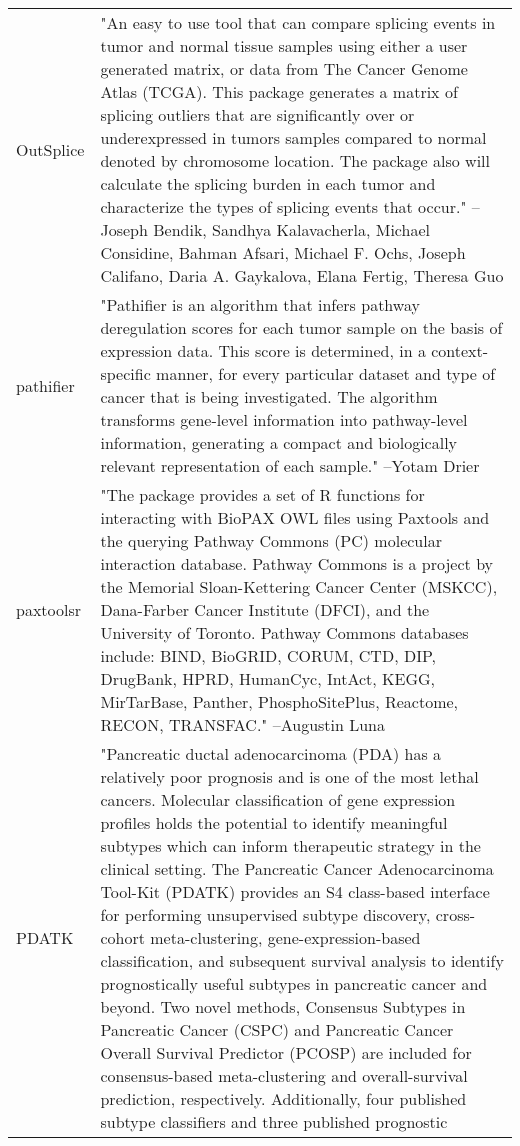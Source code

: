 \begin{longtable}[t]{l>{\raggedright\arraybackslash}p{25em}}
OutSplice & "An easy to use tool that can compare splicing events in
tumor and normal tissue samples using either a user generated
matrix, or data from The Cancer Genome Atlas (TCGA). This
package generates a matrix of splicing outliers that are
significantly over or underexpressed in tumors samples compared
to normal denoted by chromosome location. The package also will
calculate the splicing burden in each tumor and characterize
the types of splicing events that occur." --Joseph Bendik, Sandhya Kalavacherla, Michael Considine, Bahman Afsari, Michael F. Ochs, Joseph Califano, Daria A. Gaykalova, Elana Fertig, Theresa Guo\\
\addlinespace
pathifier & "Pathifier is an algorithm that infers pathway deregulation
scores for each tumor sample on the basis of expression data.
This score is determined, in a context-specific manner, for
every particular dataset and type of cancer that is being
investigated. The algorithm transforms gene-level information
into pathway-level information, generating a compact and
biologically relevant representation of each sample." --Yotam Drier\\
paxtoolsr & "The package provides a set of R functions for interacting
with BioPAX OWL files using Paxtools and the querying Pathway
Commons (PC) molecular interaction database. Pathway Commons is
a project by the Memorial Sloan-Kettering Cancer Center
(MSKCC), Dana-Farber Cancer Institute (DFCI), and the
University of Toronto. Pathway Commons databases include: BIND,
BioGRID, CORUM, CTD, DIP, DrugBank, HPRD, HumanCyc, IntAct,
KEGG, MirTarBase, Panther, PhosphoSitePlus, Reactome, RECON,
TRANSFAC." --Augustin Luna\\
PDATK & "Pancreatic ductal adenocarcinoma (PDA) has a relatively
poor prognosis and is one of the most lethal cancers. Molecular
classification of gene expression profiles holds the potential
to identify meaningful subtypes which can inform therapeutic
strategy in the clinical setting. The Pancreatic Cancer
Adenocarcinoma Tool-Kit (PDATK) provides an S4 class-based
interface for performing unsupervised subtype discovery,
cross-cohort meta-clustering, gene-expression-based
classification, and subsequent survival analysis to identify
prognostically useful subtypes in pancreatic cancer and beyond.
Two novel methods, Consensus Subtypes in Pancreatic Cancer
(CSPC) and Pancreatic Cancer Overall Survival Predictor (PCOSP)
are included for consensus-based meta-clustering and
overall-survival prediction, respectively. Additionally, four
published subtype classifiers and three published prognostic

\end{longtable}
